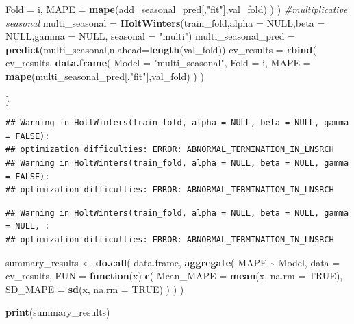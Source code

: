\documentclass[
]{article}
\newenvironment{Shaded}{\begin{snugshade}}{\end{snugshade}}
\newcommand{\AttributeTok}[1]{\textcolor[rgb]{0.13,0.29,0.53}{#1}}
\newcommand{\CommentTok}[1]{\textcolor[rgb]{0.56,0.35,0.01}{\textit{#1}}}
\newcommand{\ConstantTok}[1]{\textcolor[rgb]{0.56,0.35,0.01}{#1}}
\newcommand{\ControlFlowTok}[1]{\textcolor[rgb]{0.13,0.29,0.53}{\textbf{#1}}}
\newcommand{\FunctionTok}[1]{\textcolor[rgb]{0.13,0.29,0.53}{\textbf{#1}}}
\newcommand{\NormalTok}[1]{#1}
\newcommand{\OtherTok}[1]{\textcolor[rgb]{0.56,0.35,0.01}{#1}}
\newcommand{\SpecialCharTok}[1]{\textcolor[rgb]{0.81,0.36,0.00}{\textbf{#1}}}
\newcommand{\StringTok}[1]{\textcolor[rgb]{0.31,0.60,0.02}{#1}}
\begin{document}
\begin{Shaded}
\begin{Highlighting}[]
                  \AttributeTok{Fold =}\NormalTok{ i,}
                  \AttributeTok{MAPE =} \FunctionTok{mape}\NormalTok{(add\_seasonal\_pred[,}\StringTok{"fit"}\NormalTok{],val\_fold)}
\NormalTok{                )}
\NormalTok{                )}
  \CommentTok{\#multiplicative seasonal }
\NormalTok{  multi\_seasonal }\OtherTok{=} \FunctionTok{HoltWinters}\NormalTok{(train\_fold,}\AttributeTok{alpha =} \ConstantTok{NULL}\NormalTok{,}\AttributeTok{beta =} \ConstantTok{NULL}\NormalTok{,}\AttributeTok{gamma =} \ConstantTok{NULL}\NormalTok{, }\AttributeTok{seasonal =} \StringTok{"multi"}\NormalTok{)}
\NormalTok{  multi\_seasonal\_pred }\OtherTok{=} \FunctionTok{predict}\NormalTok{(multi\_seasonal,}\AttributeTok{n.ahead=}\FunctionTok{length}\NormalTok{(val\_fold))}
\NormalTok{  cv\_results }\OtherTok{=} \FunctionTok{rbind}\NormalTok{( }
\NormalTok{              cv\_results,}
              \FunctionTok{data.frame}\NormalTok{(}
                \AttributeTok{Model =} \StringTok{"multi\_seasonal"}\NormalTok{,}
                \AttributeTok{Fold =}\NormalTok{ i,}
                \AttributeTok{MAPE =} \FunctionTok{mape}\NormalTok{(multi\_seasonal\_pred[,}\StringTok{"fit"}\NormalTok{],val\_fold)}
\NormalTok{              )}
\NormalTok{              )}

\NormalTok{\}}
\end{Highlighting}
\end{Shaded}

\begin{verbatim}
## Warning in HoltWinters(train_fold, alpha = NULL, beta = NULL, gamma = FALSE):
## optimization difficulties: ERROR: ABNORMAL_TERMINATION_IN_LNSRCH
## Warning in HoltWinters(train_fold, alpha = NULL, beta = NULL, gamma = FALSE):
## optimization difficulties: ERROR: ABNORMAL_TERMINATION_IN_LNSRCH
\end{verbatim}

\begin{verbatim}
## Warning in HoltWinters(train_fold, alpha = NULL, beta = NULL, gamma = NULL, :
## optimization difficulties: ERROR: ABNORMAL_TERMINATION_IN_LNSRCH
\end{verbatim}

\begin{Shaded}
\begin{Highlighting}[]
\NormalTok{summary\_results }\OtherTok{\textless{}{-}} \FunctionTok{do.call}\NormalTok{(}
\NormalTok{  data.frame,}
  \FunctionTok{aggregate}\NormalTok{(}
\NormalTok{    MAPE }\SpecialCharTok{\textasciitilde{}}\NormalTok{ Model,}
    \AttributeTok{data =}\NormalTok{ cv\_results,}
    \AttributeTok{FUN =} \ControlFlowTok{function}\NormalTok{(x)}
      \FunctionTok{c}\NormalTok{(}
        \AttributeTok{Mean\_MAPE =} \FunctionTok{mean}\NormalTok{(x, }\AttributeTok{na.rm =} \ConstantTok{TRUE}\NormalTok{),}
        \AttributeTok{SD\_MAPE   =} \FunctionTok{sd}\NormalTok{(x, }\AttributeTok{na.rm =} \ConstantTok{TRUE}\NormalTok{)}
\NormalTok{      )}
\NormalTok{  )}
\NormalTok{)}

\FunctionTok{print}\NormalTok{(summary\_results)}
\end{Highlighting}
\end{Shaded}
\end{document}
